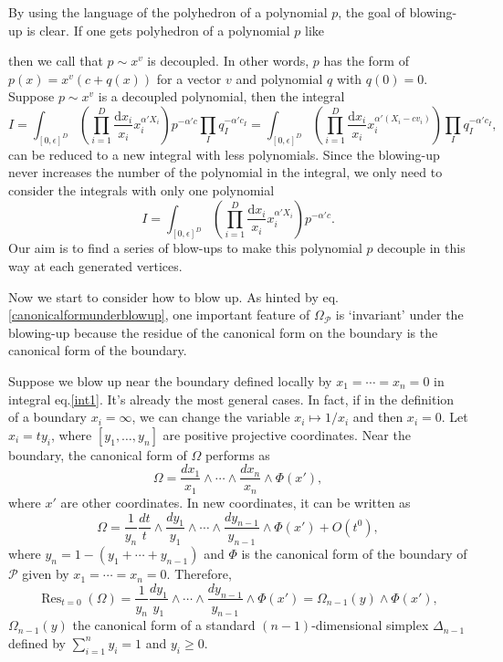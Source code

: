 \documentclass[12pt]{article}
\theoremstyle{definition}
\theoremstyle{plain}
\newcommand{\dif}{\mathrm{d}} %
\begin{document}
By using the language of the polyhedron of a polynomial $p$, the goal of blowing-up is clear.
If one gets polyhedron of a polynomial $p$ like
\begin{center}
\end{center}
then we call that $p\sim x^v$ is decoupled. In other words, $p$ has the form of 
\(
p(x)=x^v(c+q(x))
\) for a vector $v$ and polynomial $q$ with $q(0)=0$. 
Suppose $p\sim x^v$ is a decoupled polynomial, then
the integral
\[
	I=\int_{[0,\epsilon]^D} \left(\prod_{i=1}^D\frac{\dif x_i}{x_i}x_i^{\alpha' X_i}\right)
	p^{-\alpha' c} \prod_I q_I^{-\alpha' c_I}
	=\int_{[0,\epsilon]^D} \left(\prod_{i=1}^D\frac{\dif x_i}{x_i}x_i^{\alpha' (X_i-cv_i)}\right)
	\prod_I q_I^{-\alpha' c_I},
\] 
can be reduced to a new integral with less polynomials. Since the blowing-up never increases the 
number of the polynomial in the integral, we only need to consider the integrals with only one 
polynomial
\[
	I=\int_{[0,\epsilon]^D} \left(\prod_{i=1}^D\frac{\dif x_i}{x_i}x_i^{\alpha' X_i}\right)
	p^{-\alpha' c}.
\] 
Our aim is to find a series of blow-ups to make this polynomial $p$ decouple in this way at
each generated vertices.

Now we start to consider how to blow up. 
As hinted by eq.\eqref{canonicalformunderblowup}, one important feature of $\Omega_{\mathcal P}$
is `invariant' under the blowing-up because the residue of the canonical form on the boundary is
the canonical form of the boundary.

Suppose we blow up near the boundary defined locally by $x_1=\cdots=x_n=0$ in integral eq.\eqref{int1}. 
It's already the most general cases. In fact, if in the definition of a boundary $x_i=\infty$, we can
change the variable $x_i\mapsto 1/x_i$ and then $x_i=0$.
Let $x_i=ty_i$, where $[y_1,\dots,y_n]$ are positive projective coordinates. 
Near the boundary, the canonical form of $\Omega$ performs as 
\[
	\Omega=\frac{dx_1}{x_1}\wedge \cdots\wedge\frac{dx_n}{x_n}
	\wedge \Phi(x'),
\]
where $x'$ are other coordinates. In new coordinates, it can be written as 
\[
	\Omega=\frac{1}{y_n}\frac{dt}{t}\wedge \frac{dy_1}{y_1}\wedge \cdots
	\wedge\frac{dy_{n-1}}{y_{n-1}}\wedge \Phi(x')+O(t^0),
\]
where $y_n=1-(y_1+\cdots+y_{n-1})$ and $\Phi$ is the canonical form of the boundary of $\mathcal P$ given by $x_1=\cdots=x_n=0$. Therefore,
\[
	\operatorname{Res}_{t=0}(\Omega)=\frac{1}{y_n}\frac{dy_1}{y_1}\wedge \cdots\wedge\frac{dy_{n-1}}{y_{n-1}}\wedge \Phi(x')=\Omega_{n-1}(y)\wedge \Phi(x'),
\]
$\Omega_{n-1}(y)$ the canonical form of a standard $(n-1)$-dimensional simplex $\Delta_{n-1}$ defined by
$
	\sum_{i=1}^n y_i=1
$ and $y_i\geq 0$. 
\end{document}
